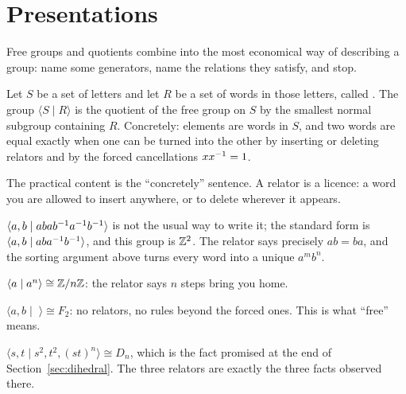 \section{Presentations}\label{sec:presentations}

Free groups and quotients combine into the most economical way of describing a group: name some
generators, name the relations they satisfy, and stop.

\begin{defi}
Let $S$ be a set of letters and let $R$ be a set of words in those letters, called .
The group $\langle S \mid R\rangle$ is the quotient of the free group on $S$ by the smallest normal
subgroup containing $R$. Concretely: elements are words in $S$, and two words are equal exactly when
one can be turned into the other by inserting or deleting relators and by the forced cancellations
$xx^{-1}=1$.
\end{defi}

The practical content is the ``concretely'' sentence. A relator is a licence: a word you are allowed
to insert anywhere, or to delete wherever it appears.



\begin{exa}
$\langle a,b \mid abab^{-1} a^{-1} b^{-1} \rangle$ is not the usual way to write it; the standard form
is $\langle a,b \mid aba^{-1} b^{-1}\rangle$, and this group is $\mathbb{Z}^2$. The relator says precisely
$ab=ba$, and the sorting argument above turns every word into a unique $a^mb^n$.
\end{exa}

\begin{exa}
$\langle a \mid a^n \rangle \cong \mathbb{Z}/n\mathbb{Z}$: the relator says $n$ steps bring you home.
\end{exa}

\begin{exa}
$\langle a,b \mid \; \rangle \cong F_2$: no relators, no rules beyond the forced ones. This is
what ``free'' means.
\end{exa}

\begin{exa}
$\langle s,t \mid s^2, t^2, (st)^n \rangle \cong D_n$, which is the fact promised at the end of
Section~\ref{sec:dihedral}. The three relators are exactly the three facts observed there.
\end{exa}

